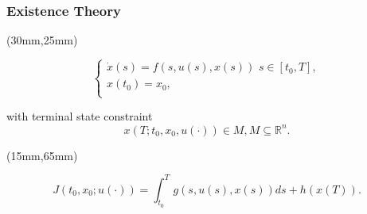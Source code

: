 \begin{frame}
	\frametitle{Existence Theory}
	\begin{textblock*}{70mm}(30mm,25mm)
		\begin{greenbox}{}
			$$\left\{ \begin{array}{l}
			\dot{x}(s)=f(s,u(s),x(s))\,\,s\in [t_0,T], \\
			x(t_0)=x_0,\\
			\end{array}
			\right.$$
	
			with terminal state constraint
			$$x(T;t_0,x_0,u(\cdot))\in M, M\subseteq \mathbb{R}^n.$$
			
		\end{greenbox}
	\end{textblock*}
	\begin{textblock*}{100mm}(15mm,65mm)
		\begin{yellowbox}{}
			$$J(t_0,x_0;u(\cdot))=\int_{t_0}^{T}g(s,u(s),x(s))ds+h(x(T)).$$
		\end{yellowbox}
	\end{textblock*}
\end{frame}


